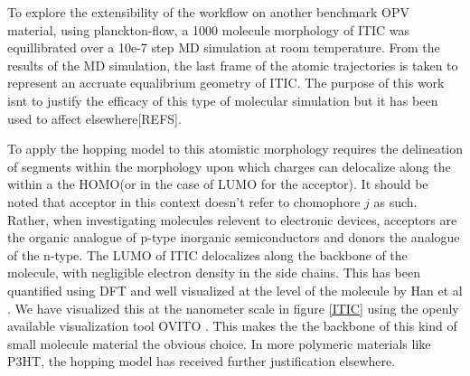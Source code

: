 To explore the extensibility of the workflow on another benchmark OPV material, using planckton-flow, a 1000
molecule morphology of ITIC was equillibrated over a 10e-7 step MD simulation at room temperature. From the results of the MD
simulation, the last frame of the atomic trajectories is taken to represent an accruate equalibrium geometry
of ITIC. The purpose of this work isnt to justify the efficacy of this type of molecular simulation but it has
been used to affect elsewhere[REFS].

To apply the hopping model to this atomistic morphology requires the
delineation of segments within the morphology upon which charges can delocalize along the within a the HOMO(or in
the case of LUMO for the acceptor). It should be noted that acceptor in this context doesn't refer to
chomophore $j$ as such. Rather, when investigating molecules relevent to electronic devices, acceptors are the
organic analogue of p-type inorganic semiconductors and donors the analogue of the n-type. 
 The LUMO of ITIC delocalizes along the backbone of the molecule, with
negligible electron density in the side chains. This has been quantified using DFT and well visualized at the
level of the molecule by Han et al \cite{Han2019}. We have visualized this at the nanometer scale in figure \ref{ITIC} using the openly
available visualization tool OVITO \cite{Stukowski2010a}. This makes the the backbone of this kind of small molecule
material the obvious choice. In more polymeric materials like P3HT, the hopping model has received further
justification elsewhere. 


